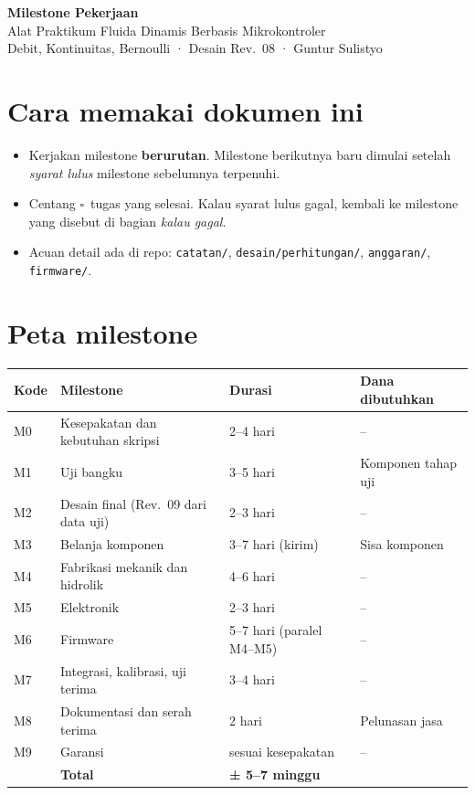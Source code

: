 \documentclass[11pt,a4paper]{article}
\newcommand{\cek}{$\square$\ }
\begin{document}
\begin{center}
  {\LARGE\bfseries\color{navy} Milestone Pekerjaan}\\[0.4em]
  {\large Alat Praktikum Fluida Dinamis Berbasis Mikrokontroler}\\[0.2em]
  {\small\color{gray} Debit, Kontinuitas, Bernoulli \;·\; Desain Rev.~08 \;·\; Guntur Sulistyo}
\end{center}

\section*{Cara memakai dokumen ini}
\begin{itemize}
  \item Kerjakan milestone \textbf{berurutan}. Milestone berikutnya baru dimulai setelah \emph{syarat lulus} milestone sebelumnya terpenuhi.
  \item Centang \cek tugas yang selesai. Kalau syarat lulus gagal, kembali ke milestone yang disebut di bagian \emph{kalau gagal}.
  \item Acuan detail ada di repo: \texttt{catatan/}, \texttt{desain/perhitungan/}, \texttt{anggaran/}, \texttt{firmware/}.
\end{itemize}

\section{Peta milestone}

\begin{tabularx}{\linewidth}{@{}l L l l@{}}
\toprule
\textbf{Kode} & \textbf{Milestone} & \textbf{Durasi} & \textbf{Dana dibutuhkan} \\
\midrule
M0 & Kesepakatan dan kebutuhan skripsi & 2--4 hari & -- \\
M1 & Uji bangku & 3--5 hari & Komponen tahap uji \\
M2 & Desain final (Rev.~09 dari data uji) & 2--3 hari & -- \\
M3 & Belanja komponen & 3--7 hari (kirim) & Sisa komponen \\
M4 & Fabrikasi mekanik dan hidrolik & 4--6 hari & -- \\
M5 & Elektronik & 2--3 hari & -- \\
M6 & Firmware & 5--7 hari (paralel M4--M5) & -- \\
M7 & Integrasi, kalibrasi, uji terima & 3--4 hari & -- \\
M8 & Dokumentasi dan serah terima & 2 hari & Pelunasan jasa \\
M9 & Garansi & sesuai kesepakatan & -- \\
\midrule
 & \textbf{Total} & \textbf{± 5--7 minggu} & \\
\bottomrule
\end{tabularx}
\end{document}
